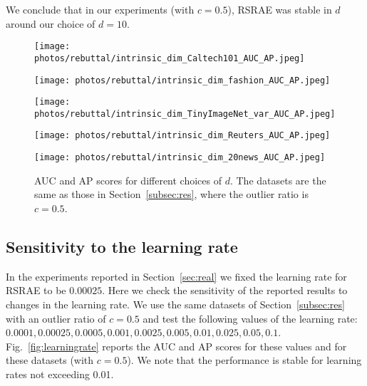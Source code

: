 \documentclass{article} \usepackage{iclr2020_conference,times}
\def\Secref#1{Section~\ref{#1}}
\begin{document}
We conclude that in our experiments (with $c=0.5$), RSRAE was stable in $d$ around our choice of $d=10$. 


\begin{figure}[htbp]
\centering
\begin{minipage}[t]{0.48\textwidth}
\centering
\texttt{[image: photos/rebuttal/intrinsic\_dim\_Caltech101\_AUC\_AP.jpeg]}
\end{minipage}
\begin{minipage}[t]{0.48\textwidth}
\centering
\texttt{[image: photos/rebuttal/intrinsic\_dim\_fashion\_AUC\_AP.jpeg]}
\end{minipage}


\centering
\begin{minipage}[t]{0.48\textwidth}
\centering
\texttt{[image: photos/rebuttal/intrinsic\_dim\_TinyImageNet\_var\_AUC\_AP.jpeg]}

\end{minipage}
\begin{minipage}[t]{0.48\textwidth}
\centering
\texttt{[image: photos/rebuttal/intrinsic\_dim\_Reuters\_AUC\_AP.jpeg]}
\end{minipage}


\centering
\begin{minipage}[t]{0.48\textwidth}
\centering
\texttt{[image: photos/rebuttal/intrinsic\_dim\_20news\_AUC\_AP.jpeg]}

\end{minipage}


\caption{AUC and AP scores for different choices of $d$. The datasets are the same as those in \Secref{subsec:res}, where the outlier ratio is $c=0.5$.
\label{fig:intrinsicdim}
}
\end{figure}




\newpage
\subsection{Sensitivity to the learning rate}
\label{subsec:learningrate}


In the experiments reported in \Secref{sec:real} we fixed the learning rate for RSRAE to be $0.00025$. Here we check the sensitivity of the reported results to changes in the learning rate.
We use the same datasets of \Secref{subsec:res} with an outlier ratio of $c=0.5$ and test the following values of the learning rate: $0.0001, 0.00025, 0.0005, 0.001, 0.0025, 0.005, 0.01, 0.025, 0.05, 0.1$.  Fig.~\ref{fig:learningrate} reports the AUC and AP scores for these values and for these datasets (with $c=0.5$). 
We note that the performance is stable for learning rates not exceeding 0.01. 
\end{document}
